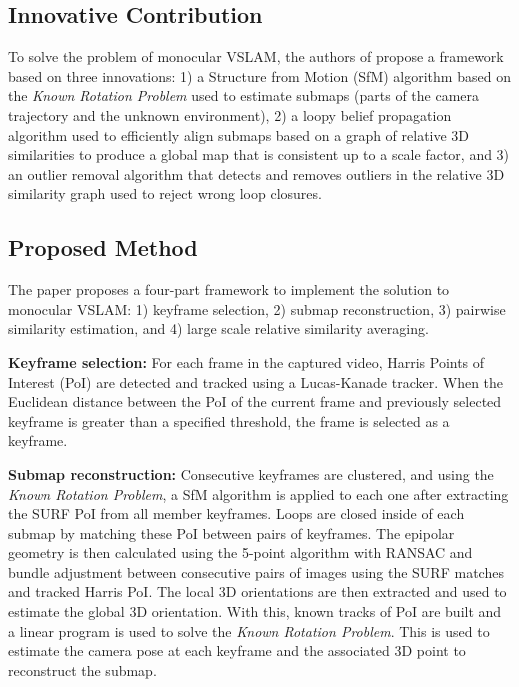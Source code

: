 \documentclass[10pt,twocolumn,letterpaper]{article}
\begin{document}
\subsection{Innovative Contribution}
To solve the problem of monocular VSLAM, the authors of \cite{Bourmaud_2015_CVPR} propose a 
framework based on three innovations:
1) a Structure from Motion (SfM) algorithm based on the \textit{Known Rotation Problem} \cite{KRot}  
used to estimate submaps (parts of the camera trajectory and the unknown environment),
2) a loopy belief propagation algorithm used to efficiently align submaps based 
on a graph of relative 3D similarities to produce a global map that is consistent up to a scale factor, and
3) an outlier removal algorithm that detects and removes outliers in the relative 3D similarity 
graph used to reject wrong loop closures.

\subsection{Proposed Method}
The paper proposes a four-part framework to implement the solution to monocular VSLAM: 
1) keyframe selection, 2) submap reconstruction, 3) pairwise similarity estimation, and 4) large scale 
relative similarity averaging.

\textbf{Keyframe selection:} For each frame in the captured video, Harris Points of Interest 
(PoI) are detected and tracked using a Lucas-Kanade tracker. When the Euclidean distance between 
the PoI of the current frame and previously selected keyframe is greater than a specified threshold, the 
frame is selected as a keyframe.

\textbf{Submap reconstruction:} Consecutive keyframes are clustered, and using the 
\textit{Known Rotation Problem}, a SfM algorithm is applied to each one after extracting the SURF 
PoI \cite{Surf} from all member keyframes. Loops are closed inside of each submap by 
matching these PoI between pairs of keyframes. The epipolar geometry is then calculated 
using the 5-point algorithm with RANSAC and bundle adjustment \cite{5pt, Ransac} between consecutive pairs of images 
using the SURF matches and tracked Harris PoI. The local 3D orientations are then extracted and used to 
estimate the global 3D orientation. With this, known tracks of PoI are built and 
a linear program is used to solve the \textit{Known Rotation Problem}. 
This is used to estimate the camera pose at each 
keyframe and the associated 3D point to reconstruct the submap.
\end{document}
